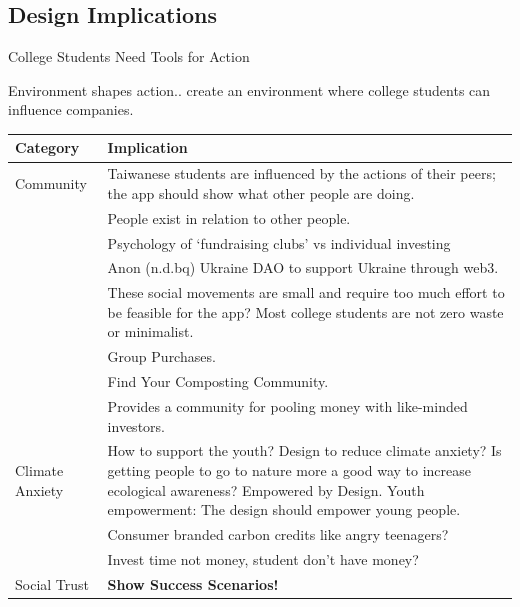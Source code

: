 \documentclass[
  letterpaper,
  DIV=11,
  numbers=noendperiod]{scrartcl}
\begin{document}
\subsection{Design Implications}\label{design-implications}

College Students Need Tools for Action

Environment shapes action.. create an environment where college students
can influence companies.

\begin{longtable}[]{@{}
  >{\raggedright\arraybackslash}p{}
  >{\raggedright\arraybackslash}p{}@{}}
\toprule\noalign{}
\begin{minipage}[b]{\linewidth}\raggedright
Category
\end{minipage} & \begin{minipage}[b]{\linewidth}\raggedright
Implication
\end{minipage} \\
\midrule\noalign{}
\endhead
\bottomrule\noalign{}
\endlastfoot
Community & Taiwanese students are influenced by the actions of their
peers; the app should show what other people are doing. \\
& People exist in relation to other people. \\
& Psychology of `fundraising clubs' vs individual investing \\
& Anon (n.d.bq) Ukraine DAO to support Ukraine through web3. \\
& These social movements are small and require too much effort to be
feasible for the app? Most college students are not zero waste or
minimalist. \\
& Group Purchases. \\
& Find Your Composting Community. \\
& Provides a community for pooling money with like-minded investors. \\
Climate Anxiety & How to support the youth? Design to reduce climate
anxiety? Is getting people to go to nature more a good way to increase
ecological awareness? Empowered by Design. Youth empowerment: The design
should empower young people. \\
& Consumer branded carbon credits like angry teenagers? \\
& Invest time not money, student don't have money? \\
Social Trust & \textbf{Show Success Scenarios!} \\

\end{longtable}
\end{document}

